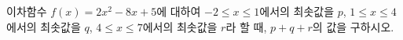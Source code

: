 이차함수 $f(x)=2x^2-8x+5$에 대하여 $-2\le x\le 1$에서의 최솟값을 $p$, $1\le x\le 4$에서의 최솟값을 $q$, $4\le x\le 7$에서의 최솟값을 $r$라 할 때, $p+q+r$의 값을 구하시오.

